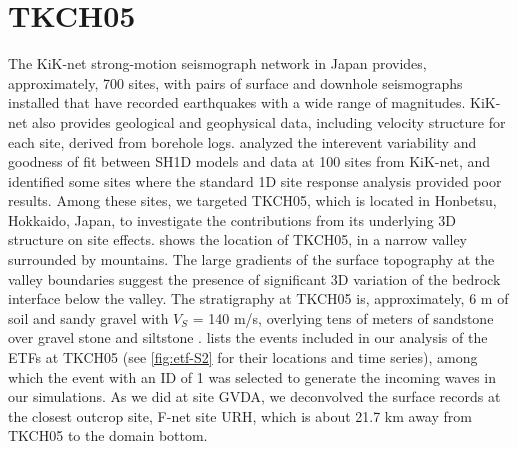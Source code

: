 \section{TKCH05}\label{etf:tkch05}
The KiK-net strong-motion seismograph network in Japan provides, approximately, 700 sites, with pairs of surface and downhole seismographs installed that have recorded earthquakes with a wide range of magnitudes. KiK-net also provides geological and geophysical data, including velocity structure for each site, derived from borehole logs. \citet{thompsonTaxonomySiteResponse2012} analyzed the interevent variability and goodness of fit between SH1D models and data at 100 sites from KiK-net, and identified some sites where the standard 1D site response analysis provided poor results. Among these sites, we targeted TKCH05, which is located in Honbetsu, Hokkaido, Japan, to investigate the contributions from its underlying 3D structure on site effects.  shows the location of TKCH05, in a narrow valley surrounded by mountains. The large gradients of the surface topography at the valley boundaries suggest the presence of significant 3D variation of the bedrock interface below the valley. The stratigraphy at TKCH05 is, approximately, 6 m of soil and sandy gravel with $V_S$ = 140 m/s, overlying tens of meters of sandstone over gravel stone and siltstone \citep[see \cref{fig:etf-6};][]{nationalresearchinstituteforearthscienceanddisasterresilienceNIEDKNETKiKnet2019}.  lists the events included in our analysis of the ETFs at TKCH05 (see \cref{fig:etf-S2} for their locations and time series), among which the event with an ID of 1 was selected to generate the incoming waves in our simulations. As we did at site GVDA, we deconvolved the surface records at the closest outcrop site, F-net site URH, which is about 21.7 km away from TKCH05 to the domain bottom.

